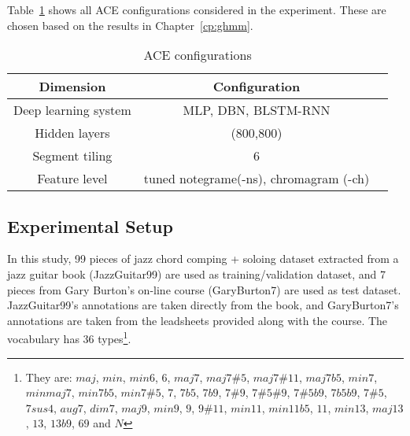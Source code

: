 Table~\ref{tab:5-aceconfig} shows all ACE configurations considered in the experiment. These are chosen based on the results in Chapter~\ref{cp:ghmm}.
\begin{table}
\centering
\footnotesize
\begin{tabular}{|c|c|c|} \hline
Dimension & Configuration \\ \hline
Deep learning system & MLP, DBN, BLSTM-RNN\\ \hline
Hidden layers & (800,800)\\ \hline
Segment tiling & 6\\ \hline
Feature level & tuned notegrame(-ns), chromagram (-ch) \\ \hline
\end{tabular}
\caption{ACE configurations}
\label{tab:5-aceconfig}
\end{table}

\subsection{Experimental Setup}
In this study, 99 pieces of jazz chord comping + soloing dataset extracted from a jazz guitar book\cite{jazzguitarbook} (JazzGuitar99) are used as training/validation dataset, and 7 pieces from Gary Burton's on-line course\cite{garyburtoncourse} (GaryBurton7) are used as test dataset. JazzGuitar99's annotations are taken directly from the book, and GaryBurton7's annotations are taken from the leadsheets provided along with the course. The vocabulary has 36 types\footnote{They are: $maj$, $min$, $min6$, $6$, $maj7$, $maj7\#5$, $maj7\#11$, $maj7b5$, $min7$, $minmaj7$, $min7b5$, $min7\#5$, $7$, $7b5$, $7b9$, $7\#9$, $7\#5\#9$, $7\#5b9$, $7b5b9$, $7\#5$, $7sus4$, $aug7$, $dim7$, $ maj9$, $min9$, $9$, $9\#11$, $min11$, $min11b5$, $11$, $min13$, $maj13$, $13$, $13b9$, $69$ and $N$}.


